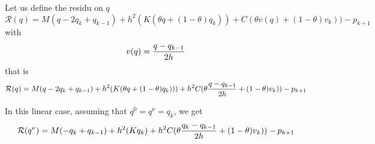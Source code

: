 Let us define the residu on $q$
\begin{equation}
  \label{eq:residu-linq}
  \mathcal R(q) =   M(q-2q_{k}+q_{k-1})  + h^2 (K(\theta q+ (1-\theta) q_k))+ C (\theta v(q)+ (1-\theta) v_k))  -  p_{k+1}
\end{equation}
with 
\begin{equation}
  \label{eq:residu-linq1}
  v(q) = \displaystyle \frac{q-q_{k-1}}{2h}
\end{equation}
that is
\begin{equation}
  \label{eq:residu-linq2}
  \mathcal R(q) =   M(q-2q_{k}+q_{k-1})  + h^2 (K(\theta q+ (1-\theta) q_k)))+  h^2 C (\theta \displaystyle \frac{q-q_{k-1}}{2h}+ (1-\theta) v_k))  -  p_{k+1}
\end{equation}

In this linear case, assuming that $q^0=q^\nu = q_k$, we get
\begin{equation}
  \label{eq:residu-linq2}
  \mathcal R(q^\nu) =   M(-q_{k}+q_{k-1})  + h^2 (K q_k)+  h^2 C (\theta \displaystyle \frac{q_k-q_{k-1}}{2h}+ (1-\theta) v_k))  -  p_{k+1}
\end{equation}


